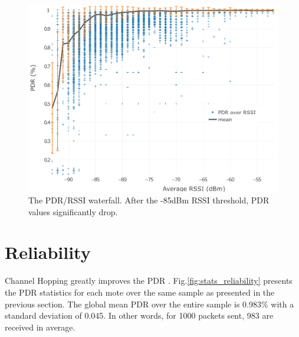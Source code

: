 \documentclass{sig-alternate}
\begin{document}
\begin{figure}
    \centering
    \includegraphics[width=\columnwidth]{waterfall}
    \caption{The PDR/RSSI waterfall. After the -85dBm RSSI threshold, PDR values significantly drop.}
    \label{fig:waterfall}
\end{figure}

\section{Reliability}
\label{sec:reliability}


Channel Hopping greatly improves the PDR \cite{watteyne2010mitigating}.
Fig.\ref{fig:stats_reliability} presents the PDR statistics for each mote over the same sample as presented in the previous section.
The global mean PDR over the entire sample is 0.983\% with a standard deviation of 0.045.
In other words, for 1000 packets sent, 983 are received in average.
\end{document}
